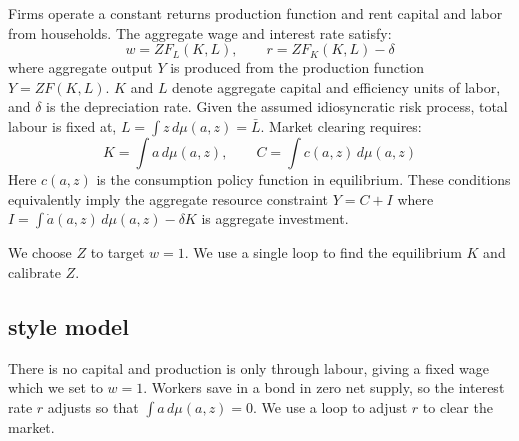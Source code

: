 \documentclass[11pt,english]{article}
\begin{document}
Firms operate a constant returns production function and rent capital and labor from households. The aggregate wage and interest rate satisfy:
\begin{equation}
\label{eq:prices}
w = Z F_L(K, L), \qquad r = Z F_K(K, L) - \delta
\end{equation}
where aggregate output $Y$ is produced from the production function \( Y = Z F(K, L) \). \( K \) and \( L \) denote aggregate capital and efficiency units of labor, and \( \delta \) is the depreciation rate. Given the assumed idiosyncratic risk process, total labour is fixed at, \( L = \int z \, d\mu(a,z) = \bar L\). Market clearing requires:
\begin{equation}
K = \int a \, d\mu(a,z), \qquad C = \int c(a,z) \, d\mu(a,z)
\end{equation}
Here $c(a,z)$ is the consumption policy function in equilibrium. These conditions equivalently imply the aggregate resource constraint $Y = C + I$ where $I = \int \dot a(a,z) \, d\mu(a,z) - \delta K$ is aggregate investment. 

We choose $Z$ to target $w=1$. We use a single loop to find the equilibrium $K$ and calibrate $Z$. 

\subsection{\cite{HuggettRiskfree1993} style model}

There is no capital and production is only through labour, giving a fixed wage which we set to $w=1$. Workers save in a bond in zero net supply, so the interest rate $r$ adjusts so that $\int a \, d\mu(a,z) = 0$. We use a loop to adjust $r$ to clear the market. 



%




 
%
%
%
%
%
%
%
%
%
%
\end{document}

